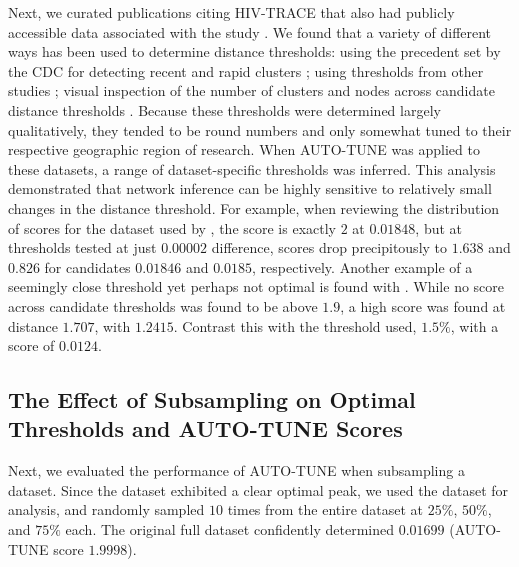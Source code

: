 \documentclass[utf8]{FrontiersinHarvard} %
\newcommand{\TODO}[1]{{\color{red}{#1}}}
\begin{document}
Next, we curated publications citing HIV-TRACE that also had publicly
accessible data associated with the study \citep{rhee_national_2019,
	brenner_role_2021, h_acquisition_2021, liu_dynamics_2020, bbosa_short_2020,
	yan_central_2020, dalai_combining_2018, sivay_hiv-1_2018}. We found that a
variety of different ways has been used to determine distance thresholds: using
the precedent set by the CDC for detecting recent and rapid clusters
\citep{yan_central_2020}; using thresholds from other studies
\citep{sivay_hiv-1_2018}; visual inspection of the number of clusters and nodes
across candidate distance thresholds \citep{liu_dynamics_2020}. Because these
thresholds were determined largely qualitatively, they tended to be round
numbers and only somewhat tuned to their respective geographic region of
research.  When AUTO-TUNE was applied to these
datasets, a range of dataset-specific thresholds was inferred. This analysis
demonstrated that network inference can be highly sensitive to relatively small
changes in the distance threshold. For example, when reviewing the distribution
of scores for the dataset used by \citep{dalai_combining_2018}, the score is
exactly $2$ at $0.01848$, but at thresholds tested at just $0.00002$
difference, scores drop precipitously to $1.638$ and $0.826$ for candidates
$0.01846$ and $0.0185$, respectively. Another example of a seemingly close
threshold yet perhaps not optimal is found with \citep{bbosa_short_2020}. While
no score across candidate thresholds was found to be above $1.9$, a high score
was found at distance $1.707$, with $1.2415$. Contrast this with the threshold
used, $1.5\%$, with a score of $0.0124$. \TODO{I would add some specifics here:
	what is $R_12$ and $C$ for those thresholds, for example? The composite score
	is difficult to appreciate intutitvely}


\subsection{The Effect of Subsampling on Optimal Thresholds and AUTO-TUNE Scores}

\TODO{Also should include some motivation}

Next, we evaluated the performance of AUTO-TUNE when subsampling a dataset.
Since the \citep{rhee_national_2019} dataset exhibited a clear optimal peak, we
used the dataset for analysis, and randomly sampled $10$ times from the entire
dataset at $25\%$, $50\%$, and $75\%$ each. The original full dataset
confidently determined $0.01699$ (AUTO-TUNE score $1.9998$).
\end{document}
